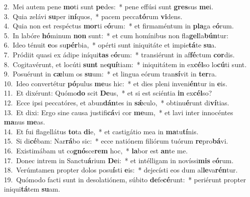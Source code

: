 {2.~}Mei autem pene \textbf{mo}ti sunt \textbf{pe}des:~* pene effúsi sunt \textbf{gres}sus \textbf{me}i.\\
{3.~}Quia zelávi \textbf{su}per i\textbf{ní}quos,~* pacem pecca\textbf{tó}rum \textbf{vi}dens.\\
{4.~}Quia non est respéctus \textbf{mor}ti e\textbf{ó}rum:~* et firmaméntum in \textbf{pla}ga e\textbf{ó}rum.\\
{5.~}In labóre \textbf{hó}minum \textbf{non} sunt:~* et cum homínibus non fla\textbf{gel}la\textbf{bún}tur:\\
{6.~}Ideo ténuit \textbf{e}os su\textbf{pér}bia,~* opérti sunt iniquitáte et impie\textbf{tá}te \textbf{su}a.\\
{7.~}Pródiit quasi ex ádipe iníqui\textbf{tas} e\textbf{ó}rum:~* transiérunt in af\textbf{fé}ctum \textbf{cor}dis.\\
{8.~}Cogitavérunt, et locúti \textbf{sunt} ne\textbf{quí}tiam:~* iniquitátem in ex\textbf{cél}so lo\textbf{cú}ti sunt.\\
{9.~}Posuérunt in \textbf{cæ}lum os \textbf{su}um:~* et lingua eórum tran\textbf{sí}vit in \textbf{ter}ra.\\
{10.~}Ideo convertétur \textbf{pó}pulus \textbf{me}us hic:~* et dies pleni inveni\textbf{én}tur in \textbf{e}is.\\
{11.~}Et dixérunt: Quómo\textbf{do} scit \textbf{De}us,~* et si est sciéntia \textbf{in} ex\textbf{cél}so?\\
{12.~}Ecce ipsi peccatóres, et abun\textbf{dán}tes in \textbf{sǽ}culo,~* obtinu\textbf{é}runt di\textbf{ví}tias.\\
{13.~}Et dixi: Ergo sine causa justifi\textbf{cá}vi cor \textbf{me}um,~* et lavi inter innocéntes \textbf{ma}nus \textbf{me}as.\\
{14.~}Et fui flagellátus \textbf{to}ta \textbf{di}e,~* et castigátio mea in \textbf{ma}tu\textbf{tí}nis.\\
{15.~}Si di\textbf{cé}bam: Nar\textbf{rá}bo sic:~* ecce natiónem filiórum tuórum \textbf{re}pro\textbf{bá}vi.\\
{16.~}Existimábam ut co\textbf{gnó}sce\textbf{rem} hoc,~* \textbf{la}bor est \textbf{an}te me.\\
{17.~}Donec intrem in Sanctu\textbf{á}rium \textbf{De}i:~* et intélligam in novíssi\textbf{mis} e\textbf{ó}rum.\\
{18.~}Verúmtamen propter dolos posu\textbf{í}sti \textbf{e}is:~* dejecísti eos dum al\textbf{le}va\textbf{rén}tur.\\
{19.~}Quómodo facti sunt in desolatiónem, súbito \textbf{de}fe\textbf{cé}runt:~* periérunt propter iniqui\textbf{tá}tem \textbf{su}am.\\
